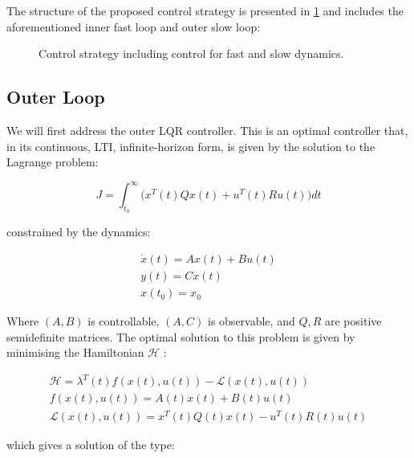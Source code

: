 The structure of the proposed control strategy is presented in \cref{fig:tikzControlStrat} and includes the aforementioned inner fast loop and outer slow loop:  

\begin{figure}[h!]
	\centering
	\resizebox{\columnwidth}{!}{
	}
	\caption{Control strategy including control for fast and slow dynamics.}
	\label{fig:tikzControlStrat}
\end{figure}

\subsection{Outer Loop}\label{subsec:OuterLoop}

We will first address the outer LQR controller. This is an optimal controller that, in its continuous, LTI, infinite-horizon form, is given by the solution to the Lagrange problem:

\begin{equation}\label{eq:LagrangeProblem}
		J = \int_{t_0}^{\infty} \big(x^T(t)Qx(t) + u^T(t)Ru(t)\big)dt
\end{equation} 

constrained by the dynamics:

\begin{equation}\label{eq:LQRDynamicsConstraint}
	\begin{gathered}
		\dot{x}(t) = Ax(t) + Bu(t) \\
		y(t) = Cx(t) \\
		x(t_0) = x_0
	\end{gathered} 
\end{equation}

Where $(A,B)$ is controllable, $(A,C)$ is observable, and $Q,R$ are positive semidefinite matrices. The optimal solution to this problem is given by minimising the Hamiltonian $\mathcal{H}$ \cite{Liberzon2012}:

\begin{equation}\label{eq:Hamiltonian}
	\begin{gathered}
			\mathcal{H} = \lambda^T(t) f(x(t),u(t)) - \mathcal{L}(x(t),u(t)) \\
			f(x(t),u(t)) = A(t)x(t) + B(t)u(t) \\
			\mathcal{L}(x(t),u(t)) =  x^T(t)Q(t)x(t) - u^T(t)R(t)u(t)
	\end{gathered}
\end{equation}

which gives a solution of the type:

